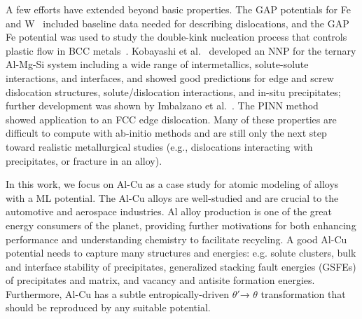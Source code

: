 \documentclass{article}
\begin{document}
A few efforts have extended beyond basic properties.  The GAP potentials for Fe~\cite{Dragoni2018AchievingIron} and W~\cite{Szlachta2014AccuracyTungsten} included baseline data needed for describing dislocations, and the GAP Fe potential was used to study the double-kink nucleation process that controls plastic flow in BCC metals~\cite{Maresca2018}.
Kobayashi et al.~\cite{Kobayashi2017} developed an NNP for the ternary Al-Mg-Si system including a wide range of intermetallics, solute-solute interactions, and interfaces, and showed good predictions for edge and screw dislocation structures, solute/dislocation interactions, and in-situ precipitates; further development was shown by Imbalzano et al.~\cite{Imbalzano2018}.
The PINN method ~\cite{PurjaPun0PhysicallyMaterials} showed application to an FCC edge dislocation.
Many of these properties are difficult to compute with ab-initio methods and are still only the next step toward realistic metallurgical studies (e.g., dislocations interacting with precipitates, or fracture in an alloy).

In this work, we focus on Al-Cu as a case study for atomic modeling of alloys with a ML potential. The Al-Cu alloys are well-studied \cite{Preston1938StructureAlloys} and are crucial to the automotive and aerospace industries\cite{Nie2014PhysicalAlloys}.  Al alloy production is one of the great energy consumers of the planet\cite{Raabe2019StrategiesMetals}, providing further motivations for both enhancing performance and understanding chemistry to facilitate recycling.  A good Al-Cu potential needs to capture many structures and energies: e.g. solute clusters, bulk and interface stability of precipitates, generalized stacking fault energies (GSFEs) of precipitates and matrix, and vacancy and antisite formation energies. Furthermore, Al-Cu has a subtle entropically-driven $\theta'$→ $\theta$ transformation \cite{Wolverton2001b} that should be reproduced by any suitable potential.
\end{document}
